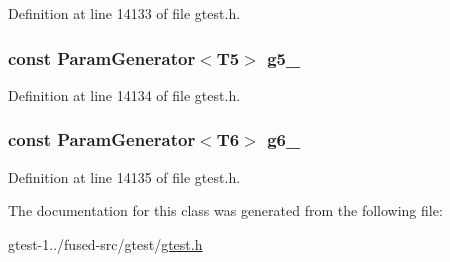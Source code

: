 \-Definition at line 14133 of file gtest.\-h.

\hypertarget{classtesting_1_1internal_1_1CartesianProductGenerator6_a938d8dc16afe9878a43d89ce3cd87ad7}{
\subsubsection[{g5\-\_\-}]{\setlength{\rightskip}{0pt plus 5cm}const {\bf \-Param\-Generator}$<$\-T5$>$ {\bf g5\-\_\-}}}\label{d3/d9a/classtesting_1_1internal_1_1CartesianProductGenerator6_a938d8dc16afe9878a43d89ce3cd87ad7}


\-Definition at line 14134 of file gtest.\-h.

\hypertarget{classtesting_1_1internal_1_1CartesianProductGenerator6_a905585e5d7722194673d92d7a29a2996}{
\subsubsection[{g6\-\_\-}]{\setlength{\rightskip}{0pt plus 5cm}const {\bf \-Param\-Generator}$<$\-T6$>$ {\bf g6\-\_\-}}}\label{d3/d9a/classtesting_1_1internal_1_1CartesianProductGenerator6_a905585e5d7722194673d92d7a29a2996}


\-Definition at line 14135 of file gtest.\-h.



\-The documentation for this class was generated from the following file\-:\begin{DoxyCompactItemize}
\item 
gtest-\/1../fused-\/src/gtest/\hyperlink{fused-src_2gtest_2gtest_8h}{gtest.\-h}\end{DoxyCompactItemize}
